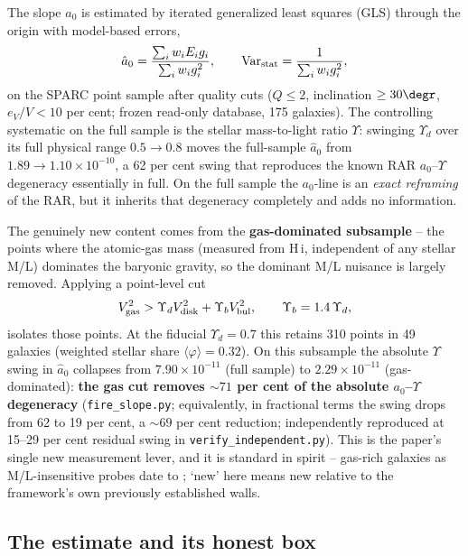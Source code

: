 \documentclass[fleqn,usenatbib]{mnras}
\begin{document}
The slope $a_0$ is estimated by iterated generalized least squares (GLS) through the origin with model-based errors,
\begin{equation}
\hat a_0=\frac{\sum_i w_i E_i g_i}{\sum_i w_i g_i^2},\qquad {\rm Var}_{\rm stat}=\frac{1}{\sum_i w_i g_i^2},
\label{eq:gls}
\end{equation}
on the SPARC point sample after quality cuts ($Q\le2$, inclination $\ge30\degr$, $e_V/V<10$ per cent; frozen read-only database, 175 galaxies). The controlling systematic on the full sample is the stellar mass-to-light ratio $\Upsilon$: swinging $\Upsilon_d$ over its full physical range $0.5\to0.8$ moves the full-sample $\hat a_0$ from $1.89\to1.10\times10^{-10}$, a 62 per cent swing that reproduces the known RAR $a_0$--$\Upsilon$ degeneracy essentially in full. On the full sample the $a_0$-line is an \emph{exact reframing} of the RAR, but it inherits that degeneracy completely and adds no information.

The genuinely new content comes from the \textbf{gas-dominated subsample} -- the points where the atomic-gas mass (measured from H\,{\sc i}, independent of any stellar M/L) dominates the baryonic gravity, so the dominant M/L nuisance is largely removed. Applying a point-level cut
\begin{equation}
V_{\rm gas}^2 > \Upsilon_d V_{\rm disk}^2 + \Upsilon_b V_{\rm bul}^2,\qquad \Upsilon_b=1.4\,\Upsilon_d,
\label{eq:gascutdef}
\end{equation}
isolates those points. At the fiducial $\Upsilon_d=0.7$ this retains 310 points in 49 galaxies (weighted stellar share $\langle\varphi\rangle=0.32$). On this subsample the absolute $\Upsilon$ swing in $\hat a_0$ collapses from $7.90\times10^{-11}$ (full sample) to $2.29\times10^{-11}$ (gas-dominated): \textbf{the gas cut removes ${\sim}71$ per cent of the absolute $a_0$--$\Upsilon$ degeneracy} (\texttt{fire\_slope.py}; equivalently, in fractional terms the swing drops from 62 to 19 per cent, a ${\sim}69$ per cent reduction; independently reproduced at 15--29 per cent residual swing in \texttt{verify\_independent.py}). This is the paper's single new measurement lever, and it is standard in spirit -- gas-rich galaxies as M/L-insensitive probes date to \citet{McGaugh2011}; `new' here means new relative to the framework's own previously established walls.

\subsection{The estimate and its honest box}
\label{sec:box}
\end{document}
